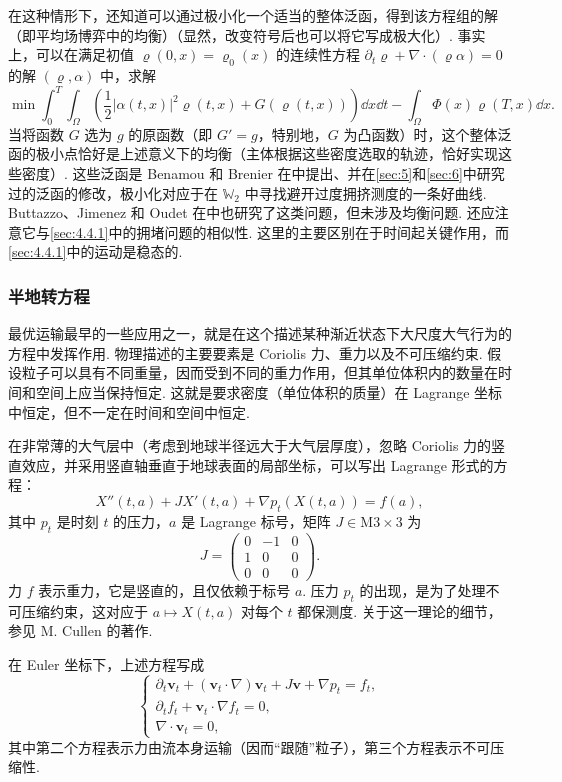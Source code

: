 在这种情形下，还知道可以通过极小化一个适当的整体泛函，得到该方程组的解（即平均场博弈中的均衡）（显然，改变符号后也可以将它写成极大化）. 事实上，可以在满足初值 $\varrho(0,x)=\varrho_0(x)$ 的连续性方程 $\partial_t\varrho+\nabla\cdot(\varrho\alpha)=0$ 的解 $(\varrho,\alpha)$ 中，求解
\[
\min\int_0^T\int_\Omega\left(\frac12|\alpha(t,x)|^2\varrho(t,x)+G(\varrho(t,x))\right)\dd x\dd t
-\int_\Omega\Phi(x)\varrho(T,x)\dd x.
\]
当将函数 $G$ 选为 $g$ 的原函数（即 $G'=g$，特别地，$G$ 为凸函数）时，这个整体泛函的极小点恰好是上述意义下的均衡（主体根据这些密度选取的轨迹，恰好实现这些密度）. \label{idx:i15-p318}
这些泛函是 Benamou 和 Brenier 在\cite{b34}中提出、并在\autoref{sec:5}和\autoref{sec:6}中研究过的泛函的修改，极小化对应于在 $\mathbb W_2$ 中寻找避开过度拥挤测度的一条好曲线. Buttazzo、Jimenez 和 Oudet 在\cite{b96}中也研究了这类问题，但未涉及均衡问题. 还应注意它与\autoref{sec:4.4.1}中的拥堵问题的相似性. 这里的主要区别在于时间起关键作用，而\autoref{sec:4.4.1}中的运动是稳态的.

\label{idx:i138-p318}
\subsubsection*{半地转方程}
最优运输最早的一些应用之一，就是在这个描述某种渐近状态下大尺度大气行为的方程中发挥作用. 物理描述的主要要素是 Coriolis 力、重力以及不可压缩约束. 假设粒子可以具有不同重量，因而受到不同的重力作用，但其单位体积内的数量在时间和空间上应当保持恒定. 这就是要求密度（单位体积的质量）在 Lagrange 坐标中恒定，但不一定在时间和空间中恒定.

在非常薄的大气层中（考虑到地球半径远大于大气层厚度），忽略 Coriolis 力的竖直效应，并采用竖直轴垂直于地球表面的局部坐标，可以写出 Lagrange 形式的方程：
\[
X''(t,a)+JX'(t,a)+\nabla p_t(X(t,a))=f(a),
\]
其中 $p_t$ 是时刻 $t$ 的压力，$a$ 是 Lagrange 标号，矩阵 $J\in\mathrm M3\times3$ 为
\[
J=\begin{pmatrix}0&-1&0\\1&0&0\\0&0&0\end{pmatrix}.
\]
力 $f$ 表示重力，它是竖直的，且仅依赖于标号 $a$. \label{idx:i118-p318}
压力 $p_t$ 的出现，是为了处理不可压缩约束，这对应于 $a\mapsto X(t,a)$ 对每个 $t$ 都保测度. 关于这一理论的细节，参见 M. Cullen 的著作\cite{b130}.

\label{idx:i54-p319}
在 Euler 坐标下，上述方程写成
\[
\begin{cases}
\partial_t\mathbf v_t+(\mathbf v_t\cdot\nabla)\mathbf v_t+J\mathbf v+\nabla p_t=f_t,\\
\partial_tf_t+\mathbf v_t\cdot\nabla f_t=0,\\
\nabla\cdot\mathbf v_t=0,
\end{cases}
\]
其中第二个方程表示力由流本身运输（因而“跟随”粒子），第三个方程表示不可压缩性.

